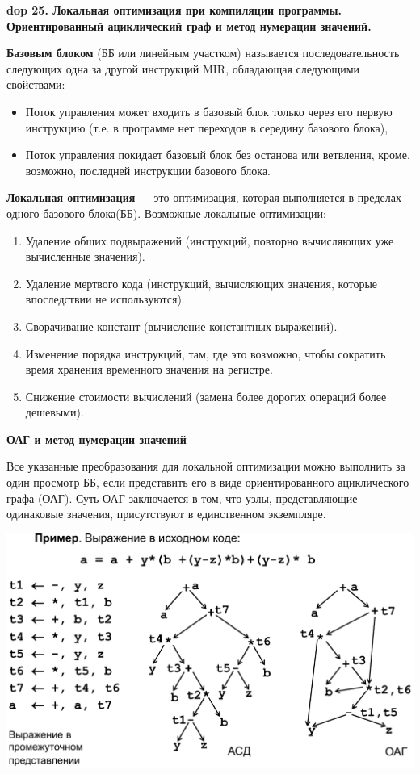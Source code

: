 \textbf{\LARGE dop 25. Локальная  оптимизация при  компиляции  программы. Ориентированный  ациклический  граф  и  метод нумерации значений.}

\textbf{Базовым блоком} (ББ или линейным участком) называется последовательность следующих одна за другой инструкций MIR, обладающая следующими свойствами:
\begin{itemize}
    \item Поток управления может входить в базовый блок только через его первую инструкцию (т.е. в программе нет переходов в середину базового блока),
    \item Поток управления покидает базовый блок без останова или ветвления, кроме, возможно, последней инструкции базового блока.
\end{itemize}

\textbf{Локальная оптимизация} --- это оптимизация, которая выполняется в пределах одного базового блока(ББ). Возможные локальные оптимизации:
\begin{enumerate}
    \item Удаление общих подвыражений (инструкций, повторно вычисляющих уже вычисленные значения).
    \item Удаление мертвого кода (инструкций, вычисляющих значения, которые впоследствии не используются).
    \item Сворачивание констант (вычисление константных выражений).
    \item Изменение порядка инструкций, там, где это возможно, чтобы сократить время хранения временного значения на регистре.
    \item Снижение стоимости вычислений (замена более дорогих операций более дешевыми).
\end{enumerate}

\textbf{ОАГ и метод нумерации значений}

Все указанные преобразования для локальной оптимизации можно выполнить за один просмотр ББ, если представить его в виде ориентированного ациклического графа (ОАГ). 
Суть ОАГ заключается в том, что узлы, представляющие одинаковые значения, присутствуют в единственном экземпляре.

\includegraphics[width=\columnwidth]{pics/oag.png}

